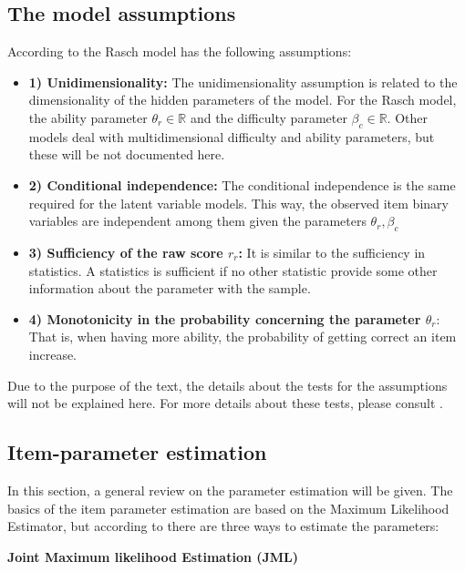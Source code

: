 \subsection{The model assumptions}

According to \cite{demars2010item} \cite{mair2009extended} the Rasch model has the following assumptions:

\begin{itemize}
\item{ \textbf{1) Unidimensionality:}} The unidimensionality assumption is related to the dimensionality of the hidden parameters of the model. For the Rasch model, the ability parameter $\theta_{r}\in \mathbb{R}$ and the difficulty parameter $\beta_{c} \in \mathbb{R}$. Other models deal with multidimensional difficulty and ability parameters, but these will be not documented here.
\item{ \textbf{2) Conditional independence:}} The conditional independence is the same required for the latent variable models. This way, the observed item binary variables are independent among them given the parameters $\theta_{r}, \beta_c$
\item{ \textbf{3) Sufficiency of the raw score $r_r$:}} It is similar to the sufficiency in statistics. A statistics is sufficient if no other statistic provide some other information about the parameter with the sample.
\item{ \textbf{4) Monotonicity in the probability concerning the parameter $\theta_r$}}: That is, when having more ability, the probability of getting correct an item increase.

\end{itemize}

Due to the purpose of the text, the details about the tests for the assumptions will not be explained here. For more details about these tests, please consult \cite{demars2010item}.

\subsection{Item-parameter estimation}

In this section, a general review on the parameter estimation will be given. The basics of the item parameter estimation are based on the Maximum Likelihood Estimator, but according to \cite{mair2009extended} there are three ways to estimate the parameters:

\textbf{Joint Maximum likelihood Estimation (JML)}

